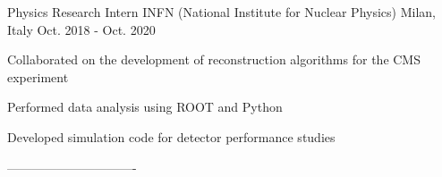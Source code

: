{Physics Research Intern} %
{INFN (National Institute for Nuclear Physics)} %
{Milan, Italy} %
{Oct. 2018 - Oct. 2020} %
{ %
\begin{cvitems}
\item {Collaborated on the development of reconstruction algorithms for the CMS experiment}
\item {Performed data analysis using ROOT and Python}
\item {Developed simulation code for detector performance studies}
\end{cvitems}
}-------------------------------




